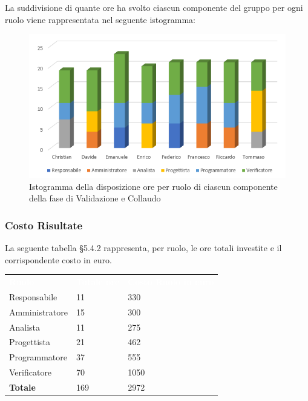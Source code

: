 La suddivisione di quante ore ha svolto ciascun componente del gruppo per ogni ruolo viene rappresentata nel seguente istogramma:

\begin{figure}[h]
	\centering
	\includegraphics[scale=2.5]{sezioni/Istogrammi/IstogrammaValidazione.png}
	\caption{Istogramma della disposizione ore per ruolo di ciascun componente della fase di Validazione e Collaudo}
\end{figure}

\subsubsection{Costo Risultate}
La seguente tabella §5.4.2 rappresenta, per ruolo, le ore totali investite e il corrispondente costo in euro.
{
	\renewcommand{\arraystretch}{2}
	\centering

	\begin{longtable}	{ C{3cm} C{2cm} C{4cm}}
		\textcolor{white}{\textbf{Ruolo}} & \textcolor{white}{\textbf{Totale ore}} & \textcolor{white}{\textbf{Costo Ruolo in euro}}\\	
        
        Responsabile & 11 & 330\\
        Amministratore & 15 & 300 \\
        Analista & 11 & 275\\
        Progettista & 21 & 462\\
        Programmatore & 37 & 555\\
        Verificatore & 70 & 1050\\
        \textbf{Totale} & 169 & 2972\
	
	\end{longtable}

	
}

